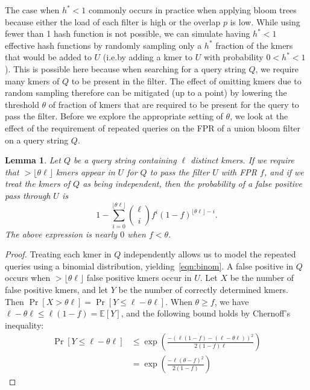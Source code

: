 \documentclass[11pt]{article}
\newtheorem{lem}{Lemma}
\newcommand\EE{\mathbb{E}}
\begin{document}
The case when $h^* < 1$  commonly occurs in practice when applying bloom trees because either the load of each filter is high or the overlap $p$ is low. While using fewer than 1 hash function is not possible, we can simulate having $h^* < 1$ effective hash functions  by randomly sampling only a $h^*$ fraction of the kmers that would be added to $U$ (i.e.\@ by adding a kmer to $U$ with probability $0 < h^* < 1$). This is possible here because when searching for a query string $Q$, we require many kmers of $Q$ to be present in the filter. The effect of omitting kmers due to random sampling therefore can be mitigated (up to a point) by lowering the  threshold $\theta$ of fraction of kmers that are required to be present  for the query to pass the filter.  Before we explore the appropriate setting of $\theta$, we look at the effect of the requirement of repeated queries on the FPR of a union bloom filter on a query string $Q$.


\begin{lem}\label{lem:query}
Let $Q$ be a query string containing $\ell$ distinct kmers. If we require that $>\lfloor\theta\ell\rfloor$ kmers appear in $U$ for $Q$ to pass the filter $U$ with FPR $f$, and if we treat the kmers of $Q$ as being independent, then the probability of a false positive pass through $U$ is
\begin{equation}\label{eqn:binom}
1 - \sum_{i=0}^{\lfloor \theta\ell\rfloor} \binom{\ell}{i}f^i(1-f)^{\lfloor\theta\ell\rfloor - i}. 
\end{equation}
The above expression is nearly $0$ when $f < \theta$.  
\end{lem}
\begin{proof}
Treating each kmer in $Q$ independently allows us to model the repeated queries using a binomial distribution, yielding~\eqref{eqn:binom}. A false positive in $Q$ occurs when $> \lfloor \theta \ell \rfloor$ false positive kmers occur in $U$. Let $X$ be the number of false positive kmers, and let $Y$ be the number of correctly determined kmers. Then
$\Pr[X > \theta\ell] = \Pr[Y \leq \ell - \theta\ell]$.
When $\theta \geq f$, we have $\ell - \theta\ell \leq \ell (1-f) = \EE[Y]$, and the following bound holds by Chernoff's inequality:
\begin{align}
\Pr[Y \leq \ell - \theta\ell] 
	&\leq \exp\left(\frac{-(\ell(1-f) - (\ell-\theta\ell))^2}{2(1-f)\ell}\right)\\
	&= \exp\left(\frac{-\ell(\theta - f)^2}{2(1-f)}\right)
\end{align}
\end{proof}
\end{document}

